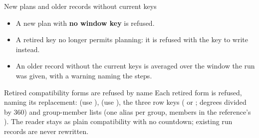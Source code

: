 \begin{frame}{New plans and older records without current keys}
\begin{itemize}
  \item A new plan with \textbf{no window key} is refused.
  \item A retired  key no longer permits planning: it
        is refused with the key to write instead.
  \item An older record without the current keys is averaged over the
        window the run was given, with a warning naming the steps.
\end{itemize}
\end{frame}

\begin{frame}{Retired compatibility forms are refused by name}
\small
Each retired form is refused, naming its replacement:
 (use ),
 (use ), the three
 row keys ( or ;
degrees divided by 360) and group-member lists (one alias per group, members in
the reference's \code{[aliases]}). The  reader stays as
plain compatibility with no countdown; existing run records are never rewritten.
\end{frame}
